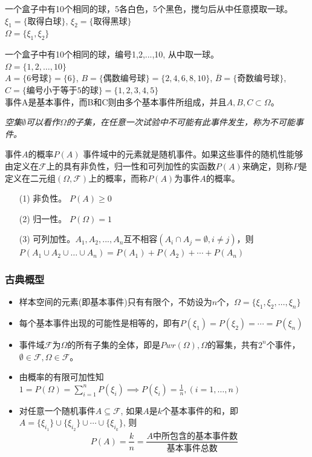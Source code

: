 \begin{frame}
\begin{example}
	一个盒子中有10个相同的球，5各白色，5个黑色，搅匀后从中任意摸取一球。\\
	$\xi_1=\{\text{取得白球} \}$, $\xi_2=\{\text{取得黑球} \}$\\
	$\Omega=\{\xi_1,\xi_2\}$
\end{example}
\begin{example}
	一个盒子中有10个相同的球，编号1,2,...,10, 从中取一球。\\
	$\Omega=\{1,2,\dots,10\}$\\
	$A=\{\text{6号球} \}=\{6\}$, $B=\{\text{偶数编号球} \}=\{2,4,6,8,10\}$, $\overline{B}=\{\text{奇数编号球}\}$,$C=\{\text{编号小于等于5的球} \}=\{1,2,3,4,5\}$\\
	事件A是基本事件，而B和C则由多个基本事件所组成，并且$A,B,C\subset\Omega$。
\end{example}
\textit{空集$\emptyset$可以看作$\Omega$的子集，在任意一次试验中不可能有此事件发生，称为不可能事件。}
\end{frame}

\begin{frame}{事件$A$的概率$P(A)$}
  事件域中的元素就是随机事件。如果这些事件的随机性能够由定义在$\mathcal{F}$上的具有非负性，归一性和可列加性的实函数$P(A)$来确定，则称$P$是定义在二元组$(\Omega,\mathcal{F})$上的概率，而称$P(A)$为事件$A$的概率。
  \begin{enumerate}
  	\item[(1)] 非负性。 $P(A)\ge 0$
  	\item[(2)] 归一性。 $P(\Omega)=1$
    \item[(3)] 可列加性。$A_1,A_2,...,A_n$互不相容$(A_i\cap A_j=\emptyset,i\ne j)$，则$P(A_1\cup A_2\cup\dots\cup A_n) = P(A_1)+P(A_2)+\cdots+P(A_n)$
  \end{enumerate}
\end{frame}

\begin{frame}
\frametitle{古典概型}
\begin{itemize}
	\item 样本空间的元素(即基本事件)只有有限个，不妨设为$n$个，$\Omega=\{\xi_1,\xi_2,\dots,\xi_n\}$
	\item 每个基本事件出现的可能性是相等的，即有$P(\xi_1)=P(\xi_2)=\cdots=P(\xi_n)$
	\item 事件域$\mathcal{F}$为$\Omega$的所有子集的全体，即是$Pwr(\Omega),\Omega$的幂集，共有$2^n$个事件，$\emptyset\in\mathcal{F},\Omega\in\mathcal{F}$。
	\item 由概率的有限可加性知\\
	$1=P(\Omega)=\sum\limits_{i=1}^{n}P(\xi_i)\implies P(\xi_i)=\frac{1}{n},(i=1,\dots,n)$
	\item 对任意一个随机事件$A\subseteq\mathcal{F}$, 如果$A$是$k$个基本事件的和，即$A=\{\xi_{i_1}\}\cup \{\xi_{i_2}\}\cup\cdots\cup\{\xi_{i_k}\}$, 则
	$$P(A)=\frac{k}{n}=\frac{\text{$A$中所包含的基本事件数}}{\text{基本事件总数}}$$
\end{itemize}
\end{frame}

